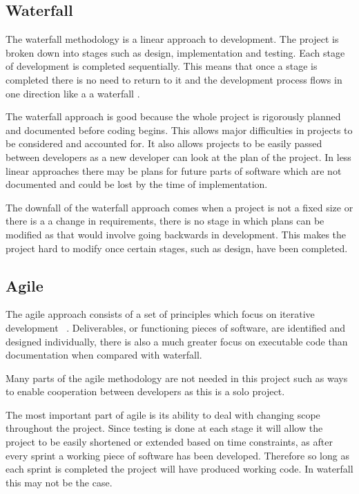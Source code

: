 \documentclass{UoYCSproject}
\begin{document}
\subsection{Waterfall}
The waterfall methodology is a linear approach to development. The project is broken down into stages such as design, implementation and testing. Each stage of development is completed sequentially. This means that once a stage is completed there is no need to return to it and the development process flows in one direction like a a waterfall \parencite{royce1987managing}.

The waterfall approach is good because the whole project is rigorously planned and documented before coding begins. This allows major difficulties in projects to be considered and accounted for. It also allows projects to be easily passed between developers as a new developer can look at the plan of the project. In less linear approaches there may be plans for future parts of software which are not documented and could be lost by the time of implementation.

The downfall of the waterfall approach comes when a project is not a fixed size or there is a a change in requirements, there is no stage in which plans can be modified as that would involve going backwards in development. This makes the project hard to modify once certain stages, such as design, have been completed.


\subsection{Agile}
The agile approach consists of a set of principles which focus on iterative development ~\parencite{beck2001agile}. Deliverables, or functioning pieces of software, are identified and designed individually, there is also a much greater focus on executable code than documentation when compared with waterfall.

Many parts of the agile methodology are not needed in this project such as ways to enable cooperation between developers as this is a solo project.

The most important part of agile is its ability to deal with changing scope throughout the project. Since testing is done at each stage it will allow the project to be easily shortened or extended based on time constraints, as after every sprint a working piece of software has been developed. Therefore so long as each sprint is completed the project will have produced working code. In waterfall this may not be the case.
\end{document}
